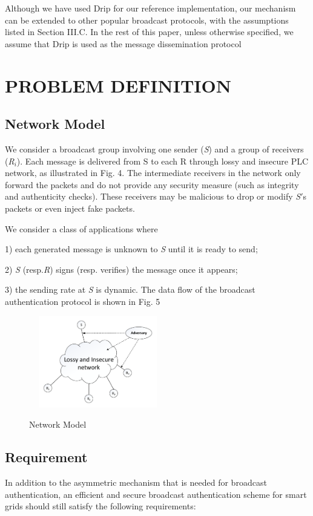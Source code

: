 \documentclass{sig-alternate-05-2015}
\begin{document}
	Although we have used Drip for our reference implementation, our mechanism can be extended to other popular broadcast protocols, with the assumptions listed in Section III.C. In the rest of this paper, unless otherwise specified, we assume that Drip is used as the message dissemination protocol

\section{ PROBLEM DEFINITION}
\subsection{Network Model}
	We consider a broadcast group involving one sender (\emph{S}) and a group of receivers (\emph{R$_i$}). Each message is delivered from S to each R through lossy and insecure PLC network, as illustrated in Fig. 4. The intermediate receivers in the network only forward the packets and do not provide any security measure (such as integrity and authenticity checks). These receivers may be malicious to drop or modify \emph{S}$'$s packets or even inject fake packets.
	
	We consider a class of applications where
	
	1) each generated message is unknown to \emph{S} until it is ready to send; 
	
	2) \emph{S} (resp.\emph{R}) signs (resp. verifies) the message once it appears; 
	
	3) the sending rate at \emph{S} is dynamic. The data flow of the broadcast authentication protocol is shown in Fig. 5
	
	
\begin{figure}
\centering
\includegraphics[width=6cm,height=4cm]{NetworkModel.pdf}\\
\caption{Network Model}\label{} 
\end{figure}

	


\subsection{Requirement}
In addition to the asymmetric mechanism that is needed for broadcast authentication, an efficient and secure broadcast authentication scheme for smart grids should still satisfy the following requirements:
\end{document}
